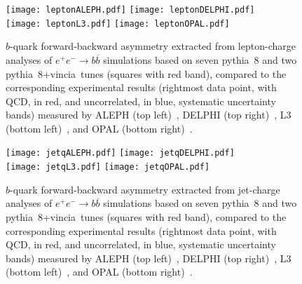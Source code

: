 \documentclass{moriond}
\newcommand{\epem}{e^+e^-}
\providecommand{\bbbar}{b\overline{b}}
\newcommand{\AFBobs}  {A_{_{\textsc{fb}}}^{obs,b}}
\newcommand{\pythia}{{\sc pythia}}
\newcommand{\vincia}{{\sc vincia}}
\begin{document}
\begin{figure}[htpb!]
\texttt{[image: leptonALEPH.pdf]}
\texttt{[image: leptonDELPHI.pdf]}\\
\texttt{[image: leptonL3.pdf]}
\texttt{[image: leptonOPAL.pdf]}
\caption[]{$b$-quark forward-backward asymmetry %
extracted from lepton-charge
analyses of $\epem\to\bbbar$ simulations based on seven \pythia~8 and 
two \pythia~8+\vincia\ tunes %
(squares with red band), compared to the corresponding
experimental results  (rightmost data point, with QCD, in red, and uncorrelated, in blue, systematic uncertainty bands) 
measured by ALEPH (top left)~\cite{leptonALEPH}, DELPHI 
(top right)~\cite{leptonDELPHI95}, L3 (bottom left)~\cite{leptonL392},
and OPAL (bottom right)~\cite{leptonOPAL}.} %
\label{fig:lepton_AFBobs_vs_MC}
\end{figure}

\begin{figure}[htpb!]
\texttt{[image: jetqALEPH.pdf]}
\texttt{[image: jetqDELPHI.pdf]}\\
\texttt{[image: jetqL3.pdf]}
\texttt{[image: jetqOPAL.pdf]}
\caption[]{$b$-quark forward-backward asymmetry %
extracted from jet-charge
analyses of $\epem\to\bbbar$ simulations based on seven \pythia~8 and 
two \pythia~8+\vincia\ tunes %
(squares with red band), compared to the corresponding
experimental results (rightmost data point, with QCD, in red, and uncorrelated, in blue, systematic uncertainty bands) 
measured by ALEPH (top left)~\cite{jetqALEPH}, DELPHI 
(top right)~\cite{jetqDELPHI}, L3 (bottom left)~\cite{jetqL3},
and OPAL (bottom right)~\cite{jetqOPAL}.} %
\label{fig:jet_AFBobs_vs_MC}
\end{figure}
\end{document}
